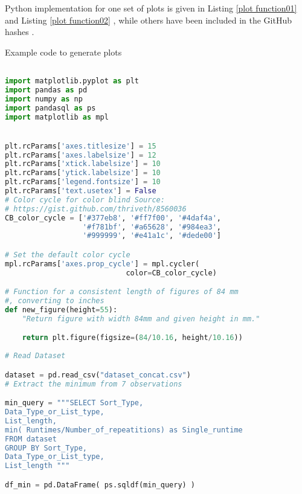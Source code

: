 \documentclass[sigconf, nonacm, natbib, screen, balance=False]{acmart}
\begin{document}
Python implementation for one set of plots is given in Listing \ref{plot function01}  and Listing \ref{plot function02} , while others have been included in the GitHub hashes .

\begin{listing}
  \caption{Example code to generate plots}
  \label{plot function01}
\begin{lstlisting}[language=Python]

import matplotlib.pyplot as plt
import pandas as pd
import numpy as np
import pandasql as ps
import matplotlib as mpl


plt.rcParams['axes.titlesize'] = 15
plt.rcParams['axes.labelsize'] = 12
plt.rcParams['xtick.labelsize'] = 10
plt.rcParams['ytick.labelsize'] = 10
plt.rcParams['legend.fontsize'] = 10
plt.rcParams['text.usetex'] = False
# Color cycle for color blind Source:
# https://gist.github.com/thriveth/8560036
CB_color_cycle = ['#377eb8', '#ff7f00', '#4daf4a',
                  '#f781bf', '#a65628', '#984ea3',
                  '#999999', '#e41a1c', '#dede00']  

# Set the default color cycle
mpl.rcParams['axes.prop_cycle'] = mpl.cycler(
                            color=CB_color_cycle) 

# Function for a consistent length of figures of 84 mm
#, converting to inches
def new_figure(height=55):
    "Return figure with width 84mm and given height in mm."

    return plt.figure(figsize=(84/10.16, height/10.16))
    
# Read Dataset 

dataset = pd.read_csv("dataset_concat.csv")
# Extract the minimum from 7 observations

min_query = """SELECT Sort_Type, 
Data_Type_or_List_type,
List_length, 
min( Runtimes/Number_of_repeatitions) as Single_runtime
FROM dataset 
GROUP BY Sort_Type, 
Data_Type_or_List_type,
List_length """

df_min = pd.DataFrame( ps.sqldf(min_query) )
\end{lstlisting}
\end{listing}
\end{document}
